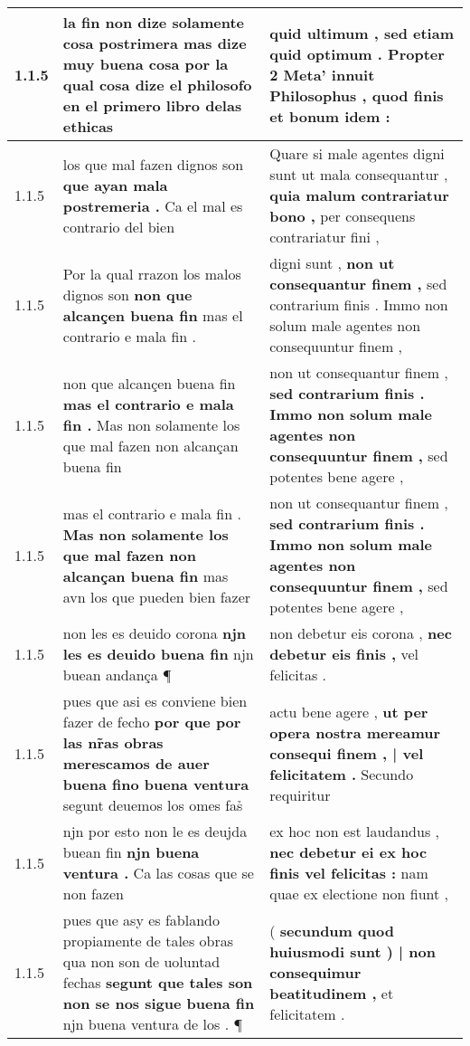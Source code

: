 \begin{tabular}{|p{1cm}|p{6.5cm}|p{6.5cm}|}
1.1.5 & la fin non dize solamente cosa postrimera \textbf{ mas dize muy buena cosa } por la qual cosa dize el philosofo en el primero libro delas ethicas & quid ultimum , \textbf{ sed etiam quid optimum . Propter 2 Meta’ innuit Philosophus , } quod finis et bonum idem : \\\hline
1.1.5 & los que mal fazen dignos son \textbf{ que ayan mala postremeria . } Ca el mal es contrario del bien & Quare si male agentes digni sunt ut mala consequantur , \textbf{ quia malum contrariatur bono , } per consequens contrariatur fini , \\\hline
1.1.5 & Por la qual rrazon los malos dignos son \textbf{ non que alcançen buena fin } mas el contrario e mala fin . & digni sunt , \textbf{ non ut consequantur finem , } sed contrarium finis . Immo non solum male agentes non consequuntur finem , \\\hline
1.1.5 & non que alcançen buena fin \textbf{ mas el contrario e mala fin . } Mas non solamente los que mal fazen non alcançan buena fin & non ut consequantur finem , \textbf{ sed contrarium finis . Immo non solum male agentes non consequuntur finem , } sed potentes bene agere , \\\hline
1.1.5 & mas el contrario e mala fin . \textbf{ Mas non solamente los que mal fazen non alcançan buena fin } mas avn los que pueden bien fazer & non ut consequantur finem , \textbf{ sed contrarium finis . Immo non solum male agentes non consequuntur finem , } sed potentes bene agere , \\\hline
1.1.5 & non les es deuido corona \textbf{ njn les es deuido buena fin } njn buean andança ¶ & non debetur eis corona , \textbf{ nec debetur eis finis , } vel felicitas . \\\hline
1.1.5 & pues que asi es conviene bien fazer de fecho \textbf{ por que por las nr̃as obras merescamos de auer buena fino buena ventura } segunt deuemos los omes fas̉ & actu bene agere , \textbf{ ut per opera nostra mereamur consequi finem , | vel felicitatem . } Secundo requiritur \\\hline
1.1.5 & njn por esto non le es deujda buean fin \textbf{ njn buena ventura . } Ca las cosas que se non fazen & ex hoc non est laudandus , \textbf{ nec debetur ei ex hoc finis vel felicitas : } nam quae ex electione non fiunt , \\\hline
1.1.5 & pues que asy es fablando propiamente de tales obras qua non son de uoluntad fechas \textbf{ segunt que tales son non se nos sigue buena fin } njn buena ventura de los . ¶ & ( \textbf{ secundum quod huiusmodi sunt ) | non consequimur beatitudinem , } et felicitatem . \\\hline

\end{tabular}
